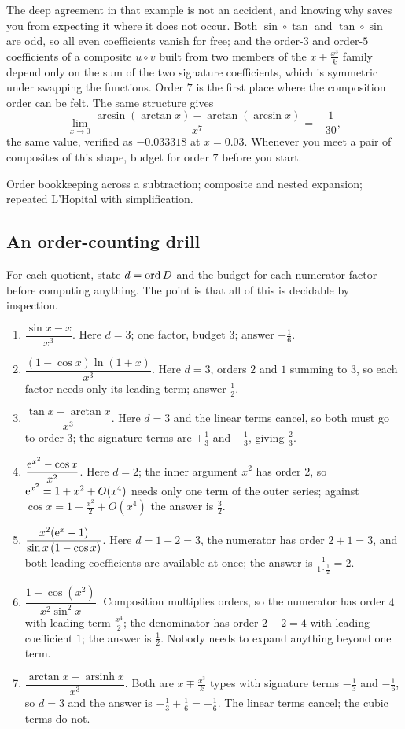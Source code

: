 The deep agreement in that example is not an accident, and knowing why saves you from expecting it where it does not occur. Both $\sin\circ\tan$ and $\tan\circ\sin$ are odd, so all even coefficients vanish for free; and the order-$3$ and order-$5$ coefficients of a composite $u\circ v$ built from two members of the $x\pm\tfrac{x^{3}}{k}$ family depend only on the sum of the two signature coefficients, which is symmetric under swapping the functions. Order $7$ is the first place where the composition order can be felt. The same structure gives
\[
\lim_{x\to0}\frac{\arcsin(\arctan x)-\arctan(\arcsin x)}{x^{7}}=-\frac1{30},
\]
the same value, verified as $-0.033318$ at $x=0.03$. Whenever you meet a pair of composites of this shape, budget for order $7$ before you start.

\begin{seealsob}Order bookkeeping across a subtraction; composite and nested expansion; repeated L'Hopital with simplification.\end{seealsob}

\subsection{An order-counting drill}

For each quotient, state $d=\operatorname{ord} D$ and the budget for each numerator factor before computing anything. The point is that all of this is decidable by inspection.

\begin{enumerate}[label=(\roman*)]
\item $\dfrac{\sin x-x}{x^{3}}$. Here $d=3$; one factor, budget $3$; answer $-\tfrac16$.
\item $\dfrac{(1-\cos x)\ln(1+x)}{x^{3}}$. Here $d=3$, orders $2$ and $1$ summing to $3$, so each factor needs only its leading term; answer $\tfrac12$.
\item $\dfrac{\tan x-\arctan x}{x^{3}}$. Here $d=3$ and the linear terms cancel, so both must go to order $3$; the signature terms are $+\tfrac13$ and $-\tfrac13$, giving $\tfrac23$.
\item $\dfrac{\mathrm{e}^{x^{2}}-\cos x}{x^{2}}$. Here $d=2$; the inner argument $x^{2}$ has order $2$, so $\mathrm{e}^{x^{2}}=1+x^{2}+O(x^{4})$ needs only one term of the outer series; against $\cos x=1-\tfrac{x^{2}}{2}+O(x^{4})$ the answer is $\tfrac32$.
\item $\dfrac{x^{2}(\mathrm{e}^{x}-1)}{\sin x\,(1-\cos x)}$. Here $d=1+2=3$, the numerator has order $2+1=3$, and both leading coefficients are available at once; the answer is $\tfrac{1}{1\cdot\frac12}=2$.
\item $\dfrac{1-\cos(x^{2})}{x^{2}\sin^{2}x}$. Composition multiplies orders, so the numerator has order $4$ with leading term $\tfrac{x^{4}}{2}$; the denominator has order $2+2=4$ with leading coefficient $1$; the answer is $\tfrac12$. Nobody needs to expand anything beyond one term.
\item $\dfrac{\arctan x-\operatorname{arsinh}x}{x^{3}}$. Both are $x\mp\tfrac{x^{3}}{k}$ types with signature terms $-\tfrac13$ and $-\tfrac16$, so $d=3$ and the answer is $-\tfrac13+\tfrac16=-\tfrac16$. The linear terms cancel; the cubic terms do not.
\end{enumerate}

